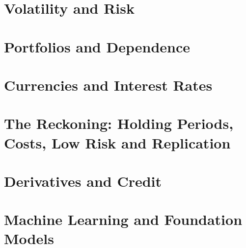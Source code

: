 \documentclass[12pt,twoside,openany]{book}
\begin{document}
\part{Volatility and Risk}
   

   


\part{Portfolios and Dependence}
   

   


\part{Currencies and Interest Rates}
   

   


\part{The Reckoning: Holding Periods, Costs, Low Risk and Replication}




  

   


\part{Derivatives and Credit}
   

  

  


\part{Machine Learning and Foundation Models}
   

   

   

   


\backmatter
\ClearThumb




\clearpage
\ClearThumb
\printindex
\end{document}
